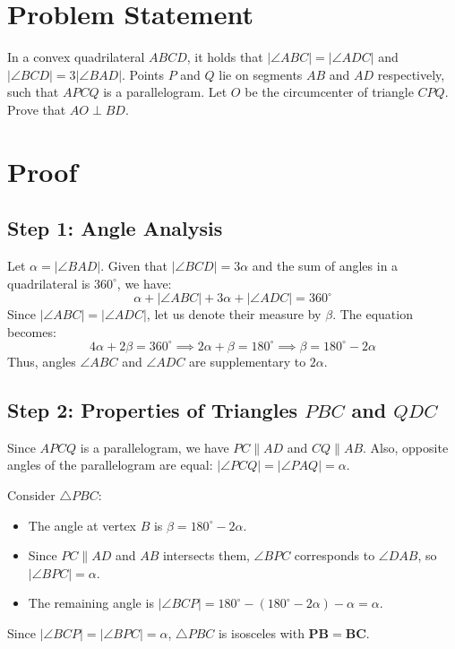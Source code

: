 \documentclass{MO}
\author{Dominik Dembinný}
\begin{document}
\makeMOheader

\section*{Problem Statement}
In a convex quadrilateral $ABCD$, it holds that $|\angle ABC| = |\angle ADC|$ and $|\angle BCD| = 3|\angle BAD|$. Points $P$ and $Q$ lie on segments $AB$ and $AD$ respectively, such that $APCQ$ is a parallelogram. Let $O$ be the circumcenter of triangle $CPQ$. Prove that $AO \perp BD$.

\section*{Proof}

\subsection*{Step 1: Angle Analysis}
Let $\alpha = |\angle BAD|$.
Given that $|\angle BCD| = 3\alpha$ and the sum of angles in a quadrilateral is $360^\circ$, we have:
\[
    \alpha + |\angle ABC| + 3\alpha + |\angle ADC| = 360^\circ
\]
Since $|\angle ABC| = |\angle ADC|$, let us denote their measure by $\beta$. The equation becomes:
\[
    4\alpha + 2\beta = 360^\circ \implies 2\alpha + \beta = 180^\circ \implies \beta = 180^\circ - 2\alpha
\]
Thus, angles $\angle ABC$ and $\angle ADC$ are supplementary to $2\alpha$.

\subsection*{Step 2: Properties of Triangles $PBC$ and $QDC$}
Since $APCQ$ is a parallelogram, we have $PC \parallel AD$ and $CQ \parallel AB$. Also, opposite angles of the parallelogram are equal: $|\angle PCQ| = |\angle PAQ| = \alpha$.

Consider $\triangle PBC$:
\begin{itemize}
    \item The angle at vertex $B$ is $\beta = 180^\circ - 2\alpha$.
    \item Since $PC \parallel AD$ and $AB$ intersects them, $\angle BPC$ corresponds to $\angle DAB$, so $|\angle BPC| = \alpha$.
    \item The remaining angle is $|\angle BCP| = 180^\circ - (180^\circ - 2\alpha) - \alpha = \alpha$.
\end{itemize}
Since $|\angle BCP| = |\angle BPC| = \alpha$, $\triangle PBC$ is isosceles with $\mathbf{PB = BC}$.
\end{document}
